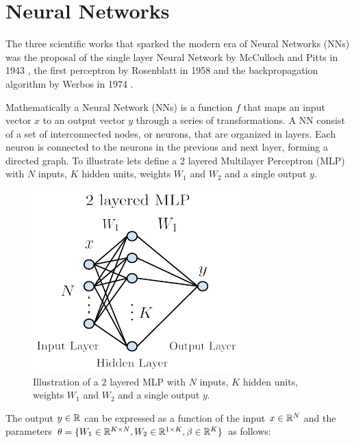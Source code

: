 


\section{Neural Networks}
The three scientific works that sparked the modern era of Neural Networks (NNs) was the proposal of the single layer Neural Network by McCulloch and Pitts in 1943 \cite{logcalc}, the first perceptron by Rosenblatt in 1958 \cite{perceptron} and the backpropagation algorithm by Werbos in 1974 \cite{backprop}.


Mathematically a Neural Network (NNs) is a function $f$ that maps an input vector $x$ to an output vector $y$ through a series of transformations. 
A NN consist of a set of interconnected nodes, or neurons, that are organized in layers. Each neuron is connected to the neurons in the previous and next layer, forming a directed graph.
To illustrate lets define a 2 layered Multilayer Perceptron (MLP) with $N$ inputs, $K$ hidden units, weights $W_1$ and $W_2$ and a single output $y$. 
\begin{figure}[H]
    \includegraphics[scale=1]{figures/figure-pdf/NN.pdf}
    \caption{Illustration of a 2 layered MLP with $N$ inputs, $K$ hidden units, weights $W_1$ and $W_2$ and a single output $y$.}
\end{figure}

The output $y \in \mathbb{R}$ can be expressed as a function of the input $x\in\mathbb{R}^N$ and the parameters $\theta=\{ W_1 \in \mathbb{R}^{K \times N}, W_2 \in \mathbb{R}^{1\times K}, \beta \in \mathbb{R}^K\}$ as follows:

